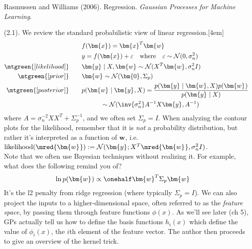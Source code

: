 \documentclass[11pt]{article}
\renewcommand\vec[2][]{\bm{#2}_{#1}}
\newcommand\p{\Needspace{10\baselineskip} \noindent}
\begin{document}
\vspace{-1.7em}
{\scriptsize Rasmussen and Williams (2006). Regression. \textit{Gaussian Processes for Machine Learning}.\\ }

\p {} (2.1). We review the standard probabilistic view of linear regression.[4em]
\begin{align}
	&f(\vec x)
		= \vec{x}^T \vec w \\
	&y 
		= f(\vec x) + \varepsilon  \quad \text{where}
			\quad \varepsilon \sim \mathcal{N}(0, \sigma_n^2) \\
	\mtgreen{[likelihood]} \qquad &\vec y \mid X, \vec w 
		\sim \mathcal{N}(X^T\vec w, \sigma_n^2 I) \\
	\mtgreen{[prior]} \qquad &\vec w 
		\sim \mathcal{N}(\vec 0, \Sigma_p) \\
	\mtgreen{[posterior]} \qquad &p(\vec w \mid \vec y, X)
		= \frac{ p(\vec y \mid \vec w, X) p(\vec w)  }{ p(\vec y \mid X)  } \\
		&\quad\qquad \sim \mathcal{N}(\inv{\sigma_n^2} A^{-1} X \vec y, A^{-1})
\end{align}
where $A = \sigma_n^{-2} X X^T + \Sigma_p^{-1}$, and we often set $\Sigma_p = I$. When analyzing the contour plots for the likelihood, remember that it is \textit{not} a probability distribution, but rather it's interpreted as a function of $\vec w$, i.e. $\text{likelihood}(\mred{\vec w}) := \mathcal{N}(\vec y; X^T \mred{\vec w}, \sigma_n^2 I)$.\\

Note that we often use Bayesian techniques without realizing it. For example, what does the following remind you of?
\begin{align}
	\ln p(\vec w) 
		&\propto \onehalf \vec{w}^T \Sigma_p \vec w
\end{align} 
It's the l2 penalty from ridge regression (where typically $\Sigma_p = I$). We can also project the inputs to a higher-dimensional space, often referred to as the \textit{feature space}, by passing them through feature functions $\phi(x)$. As we'll see later (ch 5), GPs actually tell us how to define the basis functions $h_i(x)$ which define the value of $\phi_i(x)$, the $i$th element of the feature vector.  The author then proceeds to give an overview of the kernel trick.  
\end{document}
